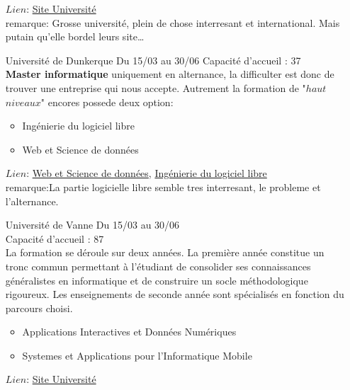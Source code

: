 \documentclass[a4paper,11pt]{article}
\begin{document}
\begin{enumerate}
                $Lien$: \href{https://im2ag.univ-grenoble-alpes.fr/menu-principal/formation/offre-de-formation/master-informatique/}{Site Université}\\
                remarque: Grosse université, plein de chose interresant et international. Mais putain qu'elle bordel leurs site\ldots
\\
        \item [\color{LightOrangeHaf}Université de Dunkerque] Du 15/03 au 30/06
                Capacité d'accueil : 37
                \\\textbf{Master informatique} uniquement en alternance, la difficulter est donc de trouver une entreprise qui nous accepte. Autrement la formation de "$haut$ $niveaux$" encores possede deux option:
                \begin{itemize}
                    \item Ingénierie du logiciel libre
                    \item Web et Science de données
                \end{itemize}
                $Lien$: \href{https://www.univ-littoral.fr/formation/offre-de-formation/masters/master-informatique-ingenierie-des-systemes-informatiques-distribues/}{Web et Science de données}, \href{https://www.univ-littoral.fr/formation/offre-de-formation/masters/master-informatique-ingenierie-du-logiciel-libre/}{Ingénierie du logiciel libre}\\
                remarque:La partie logicielle libre semble tres interresant, le probleme et l'alternance.
\\
        \item [\color{LightOrangeHaf}Université de Vanne] Du 15/03 au 30/06
                \\Capacité d'accueil : 87
                \\La formation se déroule sur deux années. La première année constitue un tronc commun permettant à l'étudiant de consolider ses connaissances généralistes en informatique et de construire un socle méthodologique rigoureux. Les enseignements de seconde année sont spécialisés en fonction du parcours choisi.
                \begin{itemize}
                    \item Applications Interactives et Données Numériques
                    \item Systemes et Applications pour l'Informatique Mobile
                \end{itemize}
                $Lien$: \href{http://www-informatique.univ-ubs.fr/master-info/index.shtml}{Site Université}

\end{enumerate}
\end{document}
